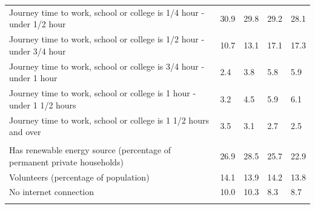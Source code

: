 \documentclass{article}
\begin{document}
\begin{table}[h]
\begin{tabular}{KTTTT}
Journey time to work, school or college is 1/4 hour - under 1/2 hour & 30.9& 29.8& 29.2& 28.1\\
Journey time to work, school or college is 1/2 hour - under 3/4 hour & 10.7& 13.1& 17.1& 17.3\\
Journey time to work, school or college is 3/4 hour - under 1 hour & 2.4& 3.8& 5.8& 5.9\\
Journey time to work, school or college is 1 hour - under 1 1/2 hours & 3.2& 4.5& 5.9& 6.1\\
Journey time to work, school or college is 1 1/2 hours and over & 3.5& 3.1& 2.7& 2.5\\
\hline
    \\ 
    \hline
Has renewable energy source (percentage of permanent private households) & 26.9& 28.5& 25.7& 22.9\\
    \hline
Volunteers (percentage of population) & 14.1& 13.9& 14.2& 13.8\\
    \hline
No internet connection& 10.0& 10.3&  8.3&  8.7\\
\hline
\end{tabular}
\end{table}
\end{document}
